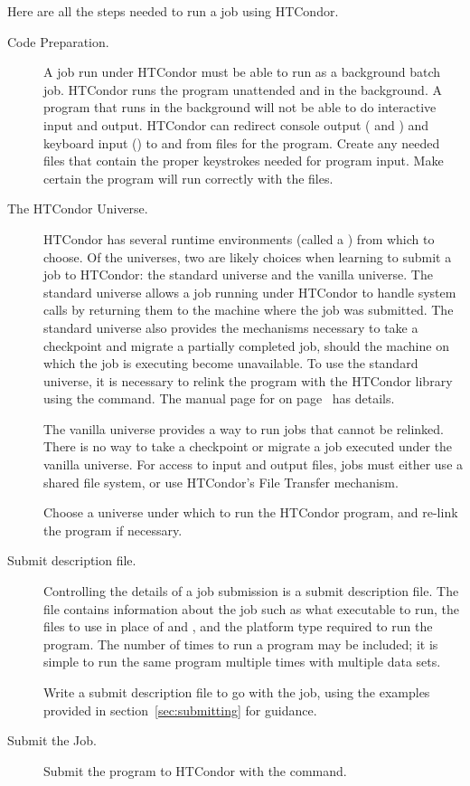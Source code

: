 Here are all the steps needed to run a job using HTCondor.
\begin{description}

\item[Code Preparation.]
A job run under HTCondor must be able to 
run as a background batch job.
HTCondor runs the program unattended and in the background. 
A program that runs in the background will not be able
to do interactive input and output.
HTCondor can redirect console output ( and )
and keyboard input ()
to and from files for the program.
Create any needed files that contain
the proper keystrokes needed for program input.
Make certain the program will run correctly with the files.

\item[The HTCondor Universe.]
HTCondor has several 
runtime environments (called a ) from which to choose.
Of the universes, two are likely choices when learning
to submit a job to HTCondor: the standard universe and the vanilla universe.
The standard universe allows a job running under HTCondor to
handle system calls by returning them to the machine where the
job was submitted.
The standard universe also provides the mechanisms necessary
to take a checkpoint and migrate a partially completed job,
should the machine on which the job is executing become
unavailable.
To use the standard universe, it is necessary to
relink the program with the HTCondor library using the
 command.
The manual page for  on page~\pageref{man-condor-compile} has details.

The vanilla universe provides a way to run jobs that cannot be
relinked.
There is no way to take a checkpoint or migrate a job executed
under the vanilla universe.
For access to input and output files, jobs must either use a shared
file system, or use HTCondor's File Transfer mechanism.

Choose a universe under which to run the HTCondor program,
and re-link the program if necessary.

\item[Submit description file.]
Controlling the details of a job submission is a
submit description file.
The file contains information
about the job such as what executable to run, the
files to use in place of  and , and
the platform type required to run the program.
The number of times to run a program may be included;
it is simple to run the same program
multiple times with multiple data sets.

Write a submit description file to go with the job, using
the examples provided in section~\ref{sec:submitting}
for guidance.

\item[Submit the Job.]Submit the program to HTCondor with
the  command.

\end{description}

